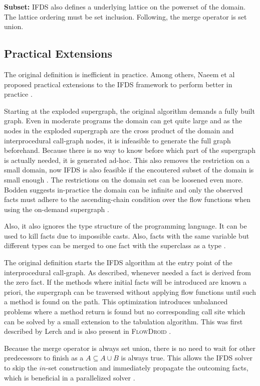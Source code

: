 \documentclass[../draft.tex]{subfiles}
\begin{document}
    \textbf{Subset:} IFDS also defines a underlying lattice on the powerset of the domain. The lattice ordering must be set inclusion. Following, the merge operator is set union.
  
    \subsection{Practical Extensions}
    The original definition is inefficient in practice. Among others, Naeem et al proposed practical extensions to the IFDS framework to perform better in practice \cite{Naeem2010}.

    Starting at the exploded supergraph, the original algorithm demands a fully built graph. Even in moderate programs the domain can get quite large and as the nodes in the exploded supergraph are the cross product of the domain and interprocedural call-graph nodes, it is infeasible to generate the full graph beforehand. Because there is no way to know before which part of the supergraph is actually needed, it is generated ad-hoc. This also removes the restriction on a small domain, now IFDS is also feasible if the encoutered subset of the domain is small enough \cite{Naeem2010}.
    The restrictions on the domain set can be loosened even more. Bodden suggests in-practice the domain can be infinite and only the observed facts must adhere to the ascending-chain condition over the flow functions when using the on-demand supergraph \cite{Bodden2012}.
    
    Also, it also ignores the type structure of the programming language. It can be used to kill facts due to impossible casts. Also, facts with the same variable but different types can be merged to one fact with the superclass as a type \cite{Naeem2010}.

    The original definition starts the IFDS algorithm at the entry point of the interprocedural call-graph. As described, whenever needed a fact is derived from the zero fact. If the methods where initial facts will be introduced are known a priori, the supergraph can be traversed without applying flow functions until such a method is found on the path. This optimization introduces unbalanced problems where a method return is found but no corresponding call site which can be solved by a small extension to the tabulation algorithm. This was first described by Lerch \cite{Lerch2015} and is also present in \textsc{FlowDroid} \cite{Arzt2017PhD}.     

    Because the merge operator is always set union, there is no need to wait for other predecessors to finish as a $A \subseteq A \cup B$ is always true. This allows the IFDS solver to skip the $in$-set construction and immediately propagate the outcoming facts, which is beneficial in a parallelized solver \cite{Arzt2017PhD} .
\end{document}
